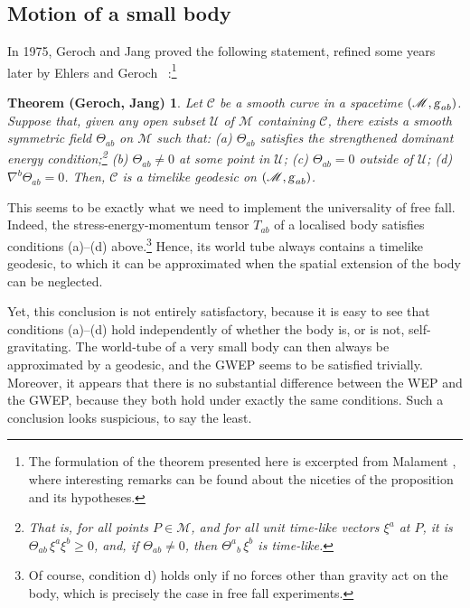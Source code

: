 \documentclass[a4paper,showkeys,aps,prd,reprint,nofootinbib,showpacs,twocolumn]{revtex4-1}
\newcommand{\ton}[1]{\left(#1\right)}
\newcommand{\eq}[1]{\( #1 \)}
\newcommand{\Scr}[1]{\mathscr{#1}}
\newcommand{\matg}{\text{\textsl{g}}}%
\theoremstyle{plain}
\newtheorem*{GJ}{Theorem (Geroch, Jang)}
\begin{document}
\subsection{Motion of a small body}
\label{Ss:gje}

In 1975, Geroch and Jang proved the following statement, refined some years later by Ehlers and Geroch ~\cite{Geroch:1975uq, Ehlers:2003tv}:\footnote{The formulation of the theorem presented here is excerpted from Malament \cite{Malament:2009ee}, where interesting remarks can be found about the niceties of the proposition and its hypotheses.}
%
\begin{GJ}
Let \eq{\Scr{C}} be a smooth curve in a spacetime \eq{\ton{\Scr{M}, \matg_{ab}}}. Suppose that, given any open subset \eq{\Scr{U}} of \eq{\Scr{M}} containing \eq{\Scr{C}}, there exists a smooth symmetric field \eq{\Theta_{ab}} on \eq{\Scr{M}} such that: (a) \eq{\Theta_{ab}} satisfies the strengthened dominant energy condition;\footnote{That is, for all points \eq{P \in \Scr{M}}, and for all unit time-like vectors \eq{\xi^a} at \eq{P}, it is \eq{\Theta_{ab}\, \xi^a \xi^b \ge 0}, and, if \eq{\Theta_{ab} \neq 0}, then \eq{{\Theta^a}_b\, \xi^b} is time-like.} (b) \eq{\Theta_{ab} \neq 0} at some point in \eq{\Scr{U}}; (c) \eq{\Theta_{ab} = 0} outside of \eq{\Scr{U}}; (d) \eq{\nabla^b \Theta_{ab} = 0}.  Then, \eq{\Scr{C}} is a timelike geodesic on \eq{\ton{\Scr{M}, \matg_{ab}}}.
\end{GJ}
%
This seems to be exactly what we need to implement the universality of free fall.  Indeed, the stress-energy-momentum tensor \eq{T_{ab}} of a localised body satisfies conditions (a)--(d) above.\footnote{Of course, condition d) holds only if no forces other than gravity act on the body, which is precisely the case in free fall experiments.}  Hence, its world tube always contains a timelike geodesic, to which it can be approximated when the spatial extension of the body can be neglected.

Yet, this conclusion is not entirely satisfactory, because it is easy to see that conditions (a)--(d) hold independently of whether the body is, or is not, self-gravitating.  The world-tube of a very small body can then always be approximated by a geodesic, and the GWEP seems to be satisfied trivially.  Moreover, it appears that there is no substantial difference between the WEP and the GWEP, because they both hold under exactly the same conditions. Such a conclusion looks suspicious, to say the least.
\end{document}
